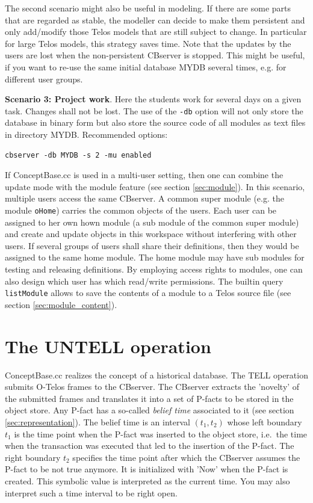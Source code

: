 The second scenario might also be useful in modeling. If there are some
parts that are regarded as stable, the modeller can decide to make
them persistent and only add/modify those Telos models that are still
subject to change. In particular for large Telos models, this strategy
saves time.
Note that the updates by the users are lost when the non-persistent
CBserver is stopped. This might be useful, if you want to re-use the same
initial database MYDB several times, e.g. for different user groups.
\newline

{\bf Scenario 3: Project work}.
Here the students work for several days on a given task. Changes shall 
not be lost. The use of the {\tt -db} option will not only store the database
in binary form but also store the source code of all modules as text
files in directory MYDB.
Recommended options:
\begin{verbatim}
cbserver -db MYDB -s 2 -mu enabled 
\end{verbatim}


If ConceptBase.cc is used in a multi-user setting, then one can combine
the update mode with the module feature (see section \ref{sec:module}).
In this scenario, multiple users access the same CBserver.
A common super module (e.g. the module {\tt oHome}) carries the common
objects of the users. Each user can be assigned to her own hown module
(a sub module of the common super module) and create and update 
objects in this workspace without interfering with other users.
If several groups of users shall share their definitions, then they would
be assigned to the same home module. The home module may have sub modules
for testing and releasing definitions. By employing access rights to
modules, one can also design which user has which read/write permissions.
The builtin query {\tt listModule} allows to save the contents of a
module to a Telos source file (see section \ref{sec:module_content}).






\section{The UNTELL operation}
\label{sec:untell}

ConceptBase.cc realizes the concept of a historical database. The TELL operation
submits O-Telos frames to the CBserver. The CBserver extracts the 'novelty'
of the submitted frames and translates it into a set of P-facts to be stored
in the object store. Any P-fact has a so-called {\em belief time\/} associated to
it (see section \ref{sec:representation}). The belief time is an interval $(t_1,t_2)$ whose left boundary $t_1$ is the time point when
the P-fact was inserted to the object store, i.e.\ the time when the transaction
was executed that led to the insertion of the P-fact. The right boundary $t_2$ specifies
the time point after which the CBserver assumes the P-fact to be not true anymore.
It is initialized with 'Now' when the P-fact is created. This symbolic value
is interpreted as the current time. You may also interpret such a time interval to be right
open.

